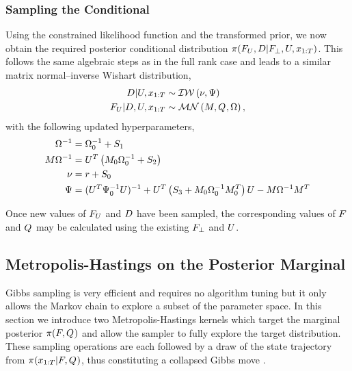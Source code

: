 \documentclass[journal,10pt]{IEEEtran}
\begin{document}
\subsubsection{Sampling the Conditional}
Using the constrained likelihood function and the transformed prior, we now obtain the required posterior conditional distribution $\pi(F_U,D|F_{\perp},U,x_{1:T})$. This follows the same algebraic steps as in the full rank case and leads to a similar matrix normal--inverse Wishart distribution,
%
\begin{align}
 D | U, x_{1:T} &\sim \mathcal{IW}\left(\nu,\Psi\right) \\
 F_U | D, U, x_{1:T} &\sim \mathcal{MN}\left(M,Q_{},\Omega\right)     ,
\end{align}
%
with the following updated hyperparameters,
%
\begin{align}
 \Omega^{-1}                 &= \Omega_0^{-1} + S_{1} \\
 M \Omega^{-1} &= U^{T}\left( M_0 \Omega_0^{-1} + S_{2} \right) \\
 \nu                                &= r + S_{0} \\
 \Psi                        &= (U^{T}\Psi_0^{-1}U)^{-1} + U^{T}\left( S_{3} + M_0 \Omega_0^{-1} M_0^{T} \right)U - M \Omega^{-1} M^{T}
\end{align}

Once new values of $F_U$ and $D$ have been sampled, the corresponding values of $F_{}$ and $Q_{}$ may be calculated using the existing $F_{\perp}$ and $U$.


\subsection{Metropolis-Hastings on the Posterior Marginal}

Gibbs sampling is very efficient and requires no algorithm tuning but it only allows the Markov chain to explore a subset of the parameter space. In this section we introduce two Metropolis-Hastings kernels which target the marginal posterior $\pi(F_{},Q_{})$ and allow the sampler to fully explore the target distribution. These sampling operations are each followed by a draw of the state trajectory from $\pi(x_{1:T}|F_{},Q_{})$, thus constituting a collapsed Gibbs move \cite{Dyk2008}.
\end{document}

